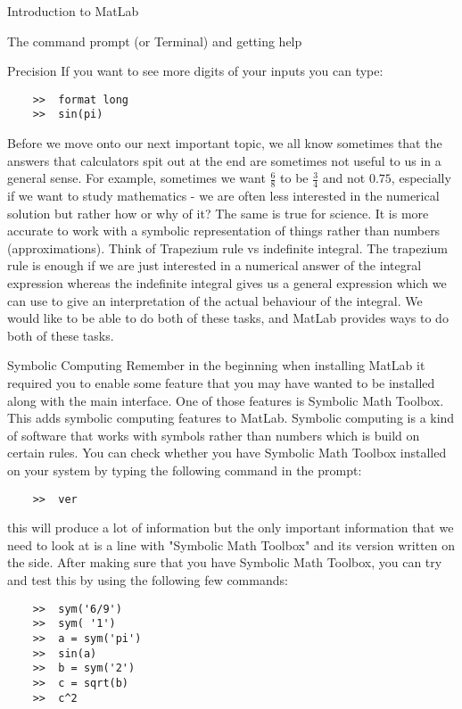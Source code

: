 \documentclass[11pt, oneside]{report}   	%
\begin{document}
\begin{chapter}{Introduction to MatLab}
\begin{section}{The command prompt (or Terminal) and getting help}
\begin{subsection}{Precision}
If you want to see more digits of your inputs you can type:
\begin{lstlisting}
	>>	format long
	>>	sin(pi)
\end{lstlisting}

\end{subsection}

Before we move onto our next important topic, we all know sometimes that the answers that calculators spit out at
the end are sometimes not useful to us in a general sense. For example, sometimes we want $\frac{6}{8}$ to be 
$\frac{3}{4}$ and not $0.75$, especially if we want to study mathematics - we are often less interested in the
numerical solution but rather how or why of it? The same is true for science. It is more accurate to work with a
symbolic representation of things rather than numbers (approximations). Think of Trapezium rule vs indefinite
integral. The trapezium rule is enough if we are just interested in a numerical answer of the integral expression
whereas the indefinite integral gives us a general expression which we can use to give an interpretation of the
actual behaviour of the integral. We would like to be able to do both of these tasks, and MatLab provides ways to
do both of these tasks.

\begin{subsection}{Symbolic Computing}
Remember in the beginning when installing MatLab it required you to enable some feature that you may have
wanted to be installed along with the main interface. One of those features is Symbolic Math Toolbox. This adds
symbolic computing features to MatLab. Symbolic computing is a kind of software that works with symbols rather
than numbers which is build on certain rules. 
You can check whether you have Symbolic Math Toolbox installed on your system by typing the following command
in the prompt:

\begin{lstlisting}
	>>	ver
\end{lstlisting}
this will produce a lot of information but the only important information that we need to look at is a line with
"Symbolic Math Toolbox" and its version written on the side.
After making sure that you have Symbolic Math Toolbox, you can try and test this by using the following few
commands:

\begin{lstlisting}
	>>	sym('6/9')
	>>	sym( '1')
	>>	a = sym('pi')
	>>	sin(a)
	>>	b = sym('2')
	>>	c = sqrt(b)
	>>	c^2
\end{lstlisting}


\end{subsection}
\end{section}
\end{chapter}
\end{document}
